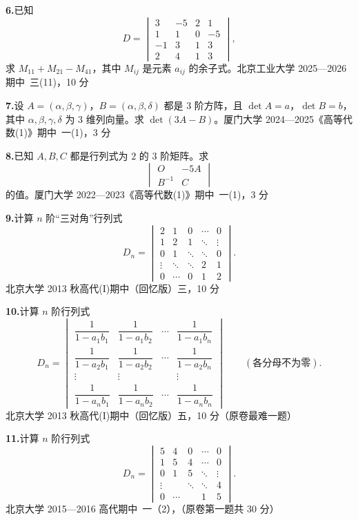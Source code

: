 ﻿\documentclass[11pt,a4paper,fontset=windows]{ctexart}
\newcommand{\src}[1]{\hfill{\small\color{hdgray}\songti #1}}
\newcommand{\prob}[2]{\Needspace{5\baselineskip}\par\vspace{10pt}\noindent
  \textbf{#1}\hspace{0.4em}#2\par\vspace{3pt}}
\begin{document}
\prob{6.}{已知
\[
D=\begin{vmatrix}
3&-5&2&1\\
1&1&0&-5\\
-1&3&1&3\\
2&4&1&3
\end{vmatrix},
\]
求 $M_{11}+M_{21}-M_{41}$，其中 $M_{ij}$ 是元素 $a_{ij}$ 的余子式。\src{北京工业大学 2025—2026 期中\ 三(11)，10 分}}

\prob{7.}{设 $A=(\alpha,\beta,\gamma)$，$B=(\alpha,\beta,\delta)$ 都是 3 阶方阵，且 $\det A=a$，$\det B=b$，
其中 $\alpha,\beta,\gamma,\delta$ 为 3 维列向量。求 $\det(3A-B)$。\src{厦门大学 2024—2025《高等代数(1)》期中\ 一(1)，3 分}}

\prob{8.}{已知 $A,B,C$ 都是行列式为 $2$ 的 3 阶矩阵。求
\[
\begin{vmatrix}
O&-5A\\
B^{-1}&C
\end{vmatrix}
\]
的值。\src{厦门大学 2022—2023《高等代数(1)》期中\ 一(1)，3 分}}

\prob{9.}{计算 $n$ 阶“三对角”行列式
\[
D_n=\begin{vmatrix}
2&1&0&\cdots&0\\
1&2&1&\ddots&\vdots\\
0&1&\ddots&\ddots&0\\
\vdots&\ddots&\ddots&2&1\\
0&\cdots&0&1&2
\end{vmatrix}.
\]
\src{北京大学 2013 秋高代(I)期中（回忆版）三，10 分}}

\prob{10.}{计算 $n$ 阶行列式
\[
D_n=\begin{vmatrix}
\dfrac{1}{1-a_1b_1}&\dfrac{1}{1-a_1b_2}&\cdots&\dfrac{1}{1-a_1b_n}\\[8pt]
\dfrac{1}{1-a_2b_1}&\dfrac{1}{1-a_2b_2}&\cdots&\dfrac{1}{1-a_2b_n}\\[8pt]
\vdots&\vdots&&\vdots\\[4pt]
\dfrac{1}{1-a_nb_1}&\dfrac{1}{1-a_nb_2}&\cdots&\dfrac{1}{1-a_nb_n}
\end{vmatrix}
\qquad(\text{各分母不为零}).
\]
\src{北京大学 2013 秋高代(I)期中（回忆版）五，10 分（原卷最难一题）}}

\prob{11.}{计算 $n$ 阶行列式
\[
D_n=\begin{vmatrix}
5&4&0&\cdots&0\\
1&5&4&\cdots&0\\
0&1&5&\ddots&\vdots\\
\vdots&&\ddots&\ddots&4\\
0&\cdots&&1&5
\end{vmatrix}.
\]
\src{北京大学 2015—2016 高代期中\ 一（2），（原卷第一题共 30 分）}}
\end{document}
